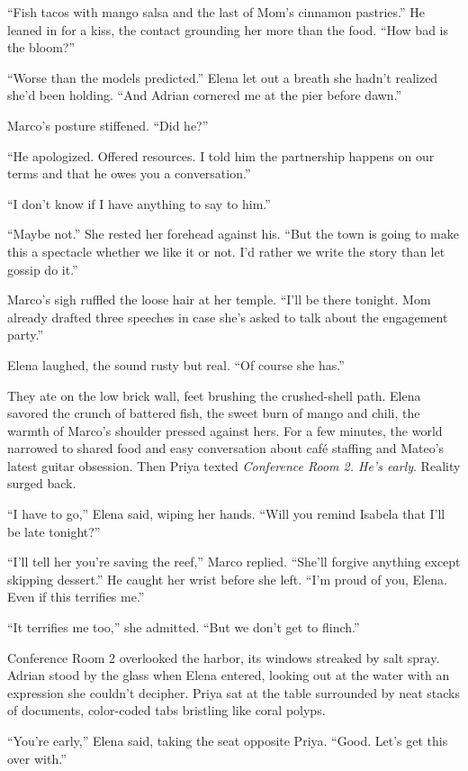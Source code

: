 “Fish tacos with mango salsa and the last of Mom’s cinnamon pastries.” He leaned in for a kiss, the contact grounding her more than the food. “How bad is the bloom?”

“Worse than the models predicted.” Elena let out a breath she hadn’t realized she’d been holding. “And Adrian cornered me at the pier before dawn.”

Marco’s posture stiffened. “Did he?”

“He apologized. Offered resources. I told him the partnership happens on our terms and that he owes you a conversation.”

“I don’t know if I have anything to say to him.”

“Maybe not.” She rested her forehead against his. “But the town is going to make this a spectacle whether we like it or not. I’d rather we write the story than let gossip do it.”

Marco’s sigh ruffled the loose hair at her temple. “I’ll be there tonight. Mom already drafted three speeches in case she’s asked to talk about the engagement party.”

Elena laughed, the sound rusty but real. “Of course she has.”

They ate on the low brick wall, feet brushing the crushed-shell path. Elena savored the crunch of battered fish, the sweet burn of mango and chili, the warmth of Marco’s shoulder pressed against hers. For a few minutes, the world narrowed to shared food and easy conversation about café staffing and Mateo’s latest guitar obsession. Then Priya texted \textit{Conference Room 2. He’s early}. Reality surged back.

“I have to go,” Elena said, wiping her hands. “Will you remind Isabela that I’ll be late tonight?”

“I’ll tell her you’re saving the reef,” Marco replied. “She’ll forgive anything except skipping dessert.” He caught her wrist before she left. “I’m proud of you, Elena. Even if this terrifies me.”

“It terrifies me too,” she admitted. “But we don’t get to flinch.”

Conference Room 2 overlooked the harbor, its windows streaked by salt spray. Adrian stood by the glass when Elena entered, looking out at the water with an expression she couldn’t decipher. Priya sat at the table surrounded by neat stacks of documents, color-coded tabs bristling like coral polyps.

“You’re early,” Elena said, taking the seat opposite Priya. “Good. Let’s get this over with.”

